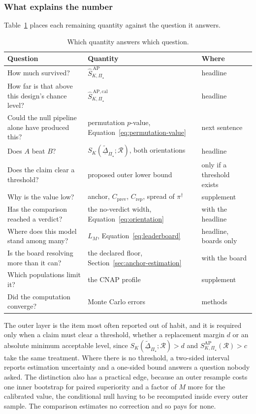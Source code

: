 \documentclass[11pt]{article}
\newcommand{\Regime}{\mathcal{R}}
\newcommand{\PSet}{\Pi_\star}
\newcommand{\SRob}{S_{K,\PSet}^{\mathrm{AP}}(\Regime)}
\newcommand{\SRobHat}{\widehat S_{K,\PSet}^{\,\mathrm{AP}}}
\newcommand{\SRobCalHat}{\widehat S_{K,\PSet}^{\,\mathrm{AP,cal}}}
\newcommand{\RobDta}{\underline{\widetilde{\Delta}}_{\PSet}}
\theoremstyle{remark}
\begin{document}
\subsubsection*{What explains the number}

Table~\ref{tab:reporting} places each remaining quantity against the question it answers.

\begin{table}[ht]
\centering
\caption{Which quantity answers which question.}
\label{tab:reporting}
\begin{tabularx}{\textwidth}{@{}XXl@{}}
\toprule
Question & Quantity & Where \\
\midrule
How much survived? & $\SRobHat$ & headline \\
How far is that above this design's chance level? & $\SRobCalHat$ & headline \\
Could the null pipeline alone have produced this? & permutation $p$-value, Equation~\eqref{eq:permutation-value} & next sentence \\
Does $A$ beat $B$? & $S_K(\RobDta;\Regime)$, both orientations & headline \\
Does the claim clear a threshold? & proposed outer lower bound & only if a threshold exists \\
Why is the value low? & anchor, $C_{\mathrm{prev}}$, $C_{\mathrm{rep}}$, spread of $\pi^\dagger$ & supplement \\
Has the comparison reached a verdict? & the no-verdict width, Equation~\eqref{eq:orientation} & with the headline \\
Where does this model stand among many? & $L_M$, Equation~\eqref{eq:leaderboard} & headline, boards only \\
Is the board resolving more than it can? & the declared floor, Section~\ref{sec:anchor-estimation} & with the board \\
Which populations limit it? & the CNAP profile & supplement \\
Did the computation converge? & Monte Carlo errors & methods \\
\bottomrule
\end{tabularx}
\end{table}

The outer layer is the item most often reported out of habit, and it is required only when a claim must clear a threshold, whether a replacement margin $d$ or an absolute minimum acceptable level, since $S_K(\RobDta;\Regime)>d$ and $\SRob>c$ take the same treatment. Where there is no threshold, a two-sided interval reports estimation uncertainty and a one-sided bound answers a question nobody asked. The distinction also has a practical edge, because an outer resample costs one inner bootstrap for paired superiority and a factor of $M$ more for the calibrated value, the conditional null having to be recomputed inside every outer sample. The comparison estimates no correction and so pays for none.
\end{document}
